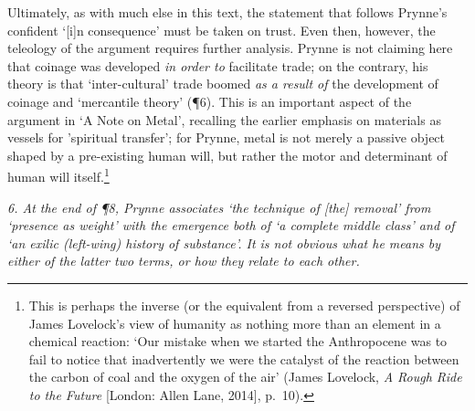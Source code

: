 \documentclass[]{article}
\begin{document}
Ultimately, as with much else in this text, the statement that follows
Prynne's confident `{[}i{]}n consequence' must be taken on trust. Even
then, however, the teleology of the argument requires further analysis.
Prynne is not claiming here that coinage was developed \emph{in order
to} facilitate trade; on the contrary, his theory is that
`inter-cultural' trade boomed \emph{as a result of} the development of
coinage and `mercantile theory' (¶6). This is an important aspect of the
argument in `A Note on Metal', recalling the earlier emphasis on
materials as vessels for 'spiritual transfer'; for Prynne, metal is not
merely a passive object shaped by a pre-existing human will, but rather
the motor and determinant of human will itself.\footnote{This is perhaps
  the inverse (or the equivalent from a reversed perspective) of James
  Lovelock's view of humanity as nothing more than an element in a
  chemical reaction: `Our mistake when we started the Anthropocene was
  to fail to notice that inadvertently we were the catalyst of the
  reaction between the carbon of coal and the oxygen of the air' (James
  Lovelock, \emph{A Rough Ride to the Future} {[}London: Allen Lane,
  2014{]}, p.~10).}

\emph{6. At the end of ¶8, Prynne associates `the technique of {[}the{]}
removal' from `presence as weight' with the emergence both of `a
complete middle class' and of `an exilic (left-wing) history of
substance'. It is not obvious what he means by either of the latter two
terms, or how they relate to each other.}
\end{document}
